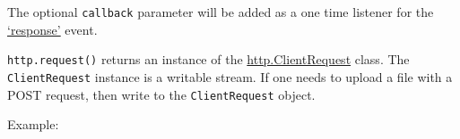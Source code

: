 The optional \texttt{callback} parameter will be added as a one time
listener for the \hyperref[httpux5feventux5fresponse]{`response'} event.

\texttt{http.request()} returns an instance of the
\hyperref[httpux5fclassux5fhttpux5fclientrequest]{http.ClientRequest}
class. The \texttt{ClientRequest} instance is a writable stream. If one
needs to upload a file with a POST request, then write to the
\texttt{ClientRequest} object.

Example:

\begin{Shaded}
\begin{Highlighting}[]
 
  \NormalTok{: }\NormalTok{,}
  \NormalTok{: }\NormalTok{,}
  \NormalTok{: }\NormalTok{,}
  \NormalTok{: }
\NormalTok{\};}

 
  \NormalTok{(} \NormalTok{+ }\NormalTok{);}
  \NormalTok{(} \NormalTok{+ }\NormalTok{(}\NormalTok{));}
  \NormalTok{(}\NormalTok{);}
  \NormalTok{(}\NormalTok{, } 
    \NormalTok{(} 
  \NormalTok{\});}
\NormalTok{\});}

\NormalTok{(}\NormalTok{, }
  \NormalTok{(} \NormalTok{+ }\NormalTok{);}
\NormalTok{\});}

\NormalTok{(}\NormalTok{);}
\NormalTok{(}\NormalTok{);}
\NormalTok{();}
\end{Highlighting}
\end{Shaded}

